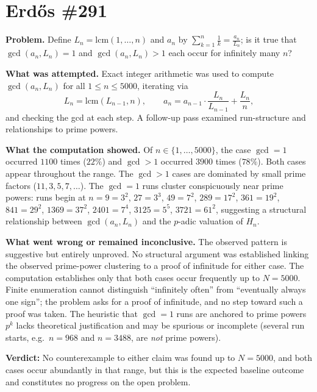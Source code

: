 \section{Erd\H{o}s \#291}

\textbf{Problem.} Define $L_n = \mathrm{lcm}(1,\dots,n)$ and $a_n$ by
$\sum_{k=1}^{n} \frac{1}{k} = \frac{a_n}{L_n}$;
is it true that $\gcd(a_n, L_n) = 1$ and $\gcd(a_n, L_n) > 1$ each occur for infinitely many $n$?

\textbf{What was attempted.} Exact integer arithmetic was used to compute $\gcd(a_n, L_n)$ for all $1 \le n \le 5000$, iterating via
\[
  L_n = \mathrm{lcm}(L_{n-1}, n), \qquad
  a_n = a_{n-1} \cdot \frac{L_n}{L_{n-1}} + \frac{L_n}{n},
\]
and checking the gcd at each step. A follow-up pass examined run-structure and relationships to prime powers.

\textbf{What the computation showed.} Of $n \in \{1,\dots,5000\}$, the case $\gcd = 1$ occurred $1100$ times ($22\%$) and $\gcd > 1$ occurred $3900$ times ($78\%$). Both cases appear throughout the range. The $\gcd > 1$ cases are dominated by small prime factors ($11, 3, 5, 7, \dots$). The $\gcd = 1$ runs cluster conspicuously near prime powers: runs begin at $n = 9 = 3^2$, $27 = 3^3$, $49 = 7^2$, $289 = 17^2$, $361 = 19^2$, $841 = 29^2$, $1369 = 37^2$, $2401 = 7^4$, $3125 = 5^5$, $3721 = 61^2$, suggesting a structural relationship between $\gcd(a_n, L_n)$ and the $p$-adic valuation of $H_n$.

\textbf{What went wrong or remained inconclusive.} The observed pattern is suggestive but entirely unproved. No structural argument was established linking the observed prime-power clustering to a proof of infinitude for either case. The computation establishes only that both cases occur frequently up to $N = 5000$. Finite enumeration cannot distinguish ``infinitely often'' from ``eventually always one sign''; the problem asks for a proof of infinitude, and no step toward such a proof was taken. The heuristic that $\gcd = 1$ runs are anchored to prime powers $p^k$ lacks theoretical justification and may be spurious or incomplete (several run starts, e.g.\ $n = 968$ and $n = 3488$, are \emph{not} prime powers).

\textbf{Verdict:} No counterexample to either claim was found up to $N = 5000$, and both cases occur abundantly in that range, but this is the expected baseline outcome and constitutes no progress on the open problem.